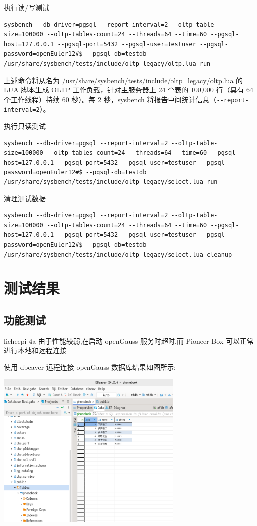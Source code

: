 \documentclass{article}
\begin{document}
执行读/写测试
\begin{verbatim}
sysbench --db-driver=pgsql --report-interval=2 --oltp-table-size=100000 --oltp-tables-count=24 --threads=64 --time=60 --pgsql-host=127.0.0.1 --pgsql-port=5432 --pgsql-user=testuser --pgsql-password=openEuler12#$ --pgsql-db=testdb /usr/share/sysbench/tests/include/oltp_legacy/oltp.lua run
\end{verbatim}
上述命令将从名为 /usr/share/sysbench/tests/include/oltp\_legacy/oltp.lua 的 LUA 脚本生成 OLTP 工作负载，针对主服务器上 24 个表的 100,000 行（具有 64 个工作线程）持续 60 秒）。每 2 秒，sysbench 将报告中间统计信息（\verb!--report-interval=2!）。

执行只读测试
\begin{verbatim}
sysbench --db-driver=pgsql --report-interval=2 --oltp-table-size=100000 --oltp-tables-count=24 --threads=64 --time=60 --pgsql-host=127.0.0.1 --pgsql-port=5432 --pgsql-user=testuser --pgsql-password=openEuler12#$ --pgsql-db=testdb /usr/share/sysbench/tests/include/oltp_legacy/select.lua run
\end{verbatim}

清理测试数据
\begin{verbatim}
sysbench --db-driver=pgsql --report-interval=2 --oltp-table-size=100000 --oltp-tables-count=24 --threads=64 --time=60 --pgsql-host=127.0.0.1 --pgsql-port=5432 --pgsql-user=testuser --pgsql-password=openEuler12#$ --pgsql-db=testdb /usr/share/sysbench/tests/include/oltp_legacy/select.lua cleanup
\end{verbatim}


\section{测试结果}

\subsection{功能测试}
licheepi 4a 由于性能较弱,在启动 openGauss 服务时超时,而 Pioneer Box 可以正常进行本地和远程连接

使用 dbeaver 远程连接 openGauss 数据库结果如图所示:

\begin{center}
\includegraphics[width=9cm]{./image/6.png}
\end{center}
\end{document}
